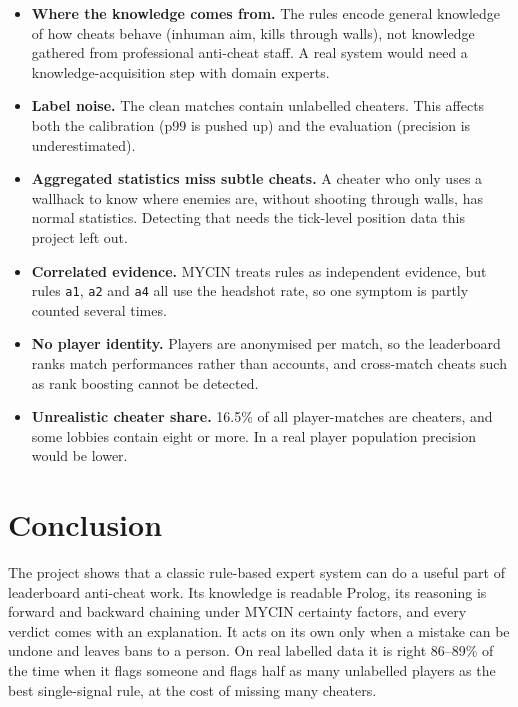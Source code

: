 \documentclass[11pt,a4paper]{article}
\newcommand{\code}[1]{\texttt{#1}}
\begin{document}
\begin{itemize}
  \item \textbf{Where the knowledge comes from.} The rules encode general knowledge of how cheats
        behave (inhuman aim, kills through walls), not knowledge gathered from professional
        anti-cheat staff. A real system would need a knowledge-acquisition step with domain experts.
  \item \textbf{Label noise.} The clean matches contain unlabelled cheaters. This affects both the
        calibration (p99 is pushed up) and the evaluation (precision is underestimated).
  \item \textbf{Aggregated statistics miss subtle cheats.} A cheater who only uses a wallhack to
        know where enemies are, without shooting through walls, has normal statistics. Detecting
        that needs the tick-level position data this project left out.
  \item \textbf{Correlated evidence.} MYCIN treats rules as independent evidence, but rules
        \code{a1}, \code{a2} and \code{a4} all use the headshot rate, so one symptom is partly
        counted several times.
  \item \textbf{No player identity.} Players are anonymised per match, so the leaderboard ranks
        match performances rather than accounts, and cross-match cheats such as rank boosting cannot
        be detected.
  \item \textbf{Unrealistic cheater share.} 16.5\% of all player-matches are cheaters, and some
        lobbies contain eight or more. In a real player population precision would be lower.
\end{itemize}

\section{Conclusion}

The project shows that a classic rule-based expert system can do a useful part of leaderboard
anti-cheat work. Its knowledge is readable Prolog, its reasoning is forward and backward chaining
under MYCIN certainty factors, and every verdict comes with an explanation. It acts on its own only
when a mistake can be undone and leaves bans to a person. On real labelled data it is right
86--89\% of the time when it flags someone and flags half as many unlabelled players as the best
single-signal rule, at the cost of missing many cheaters.
\end{document}
